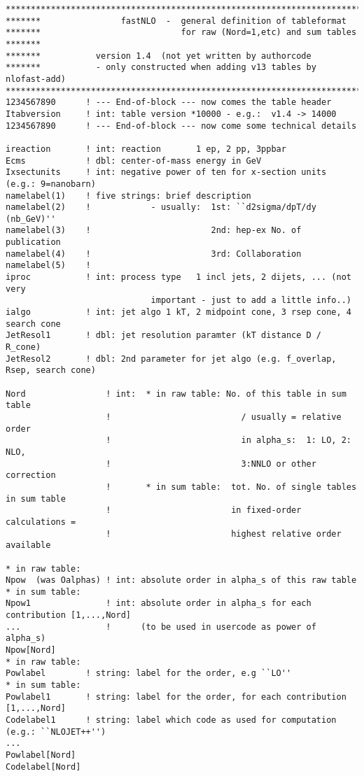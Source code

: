 {\small \footnotesize
\begin{verbatim} 
******************************************************************************
*******                fastNLO  -  general definition of tableformat
*******                            for raw (Nord=1,etc) and sum tables
*******
*******           version 1.4  (not yet written by authorcode 
*******           - only constructed when adding v13 tables by nlofast-add)
******************************************************************************
1234567890      ! --- End-of-block --- now comes the table header
Itabversion     ! int: table version *10000 - e.g.:  v1.4 -> 14000
1234567890      ! --- End-of-block --- now come some technical details

ireaction       ! int: reaction       1 ep, 2 pp, 3ppbar
Ecms            ! dbl: center-of-mass energy in GeV
Ixsectunits     ! int: negative power of ten for x-section units (e.g.: 9=nanobarn)
namelabel(1)    ! five strings: brief description
namelabel(2)    !            - usually:  1st: ``d2sigma/dpT/dy (nb_GeV)''
namelabel(3)    !                        2nd: hep-ex No. of publication 
namelabel(4)    !                        3rd: Collaboration
namelabel(5)    !
iproc           ! int: process type   1 incl jets, 2 dijets, ... (not very 
                             important - just to add a little info..)
ialgo           ! int: jet algo 1 kT, 2 midpoint cone, 3 rsep cone, 4 search cone 
JetResol1       ! dbl: jet resolution paramter (kT distance D / R_cone)
JetResol2       ! dbl: 2nd parameter for jet algo (e.g. f_overlap, Rsep, search cone)

Nord                ! int:  * in raw table: No. of this table in sum table
                    !                          / usually = relative order 
                    !                          in alpha_s:  1: LO, 2: NLO, 
                    !                          3:NNLO or other correction
                    !       * in sum table:  tot. No. of single tables in sum table 
                    !                        in fixed-order calculations =
                    !                        highest relative order available

* in raw table:
Npow  (was Oalphas) ! int: absolute order in alpha_s of this raw table
* in sum table:
Npow1               ! int: absolute order in alpha_s for each contribution [1,...,Nord]
...                 !      (to be used in usercode as power of alpha_s) 
Npow[Nord]
* in raw table:
Powlabel        ! string: label for the order, e.g ``LO''
* in sum table:
Powlabel1       ! string: label for the order, for each contribution [1,...,Nord]
Codelabel1      ! string: label which code as used for computation (e.g.: ``NLOJET++'')
...                
Powlabel[Nord]
Codelabel[Nord]



\end{verbatim}}

